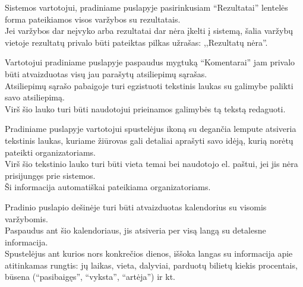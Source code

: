 \documentclass{VUMIFPSkursinis}
\begin{document}
\begin{longtabu}
    {
      Sistemos vartotojui, pradiniame puslapyje pasirinkusiam “Rezultatai” lentelės forma pateikiamos visos varžybos su rezultatais. \\
      Jei varžybos dar neįvyko arba rezultatai dar nėra įkelti į sistemą, šalia varžybų vietoje rezultatų privalo būti pateiktas pilkas užrašas: 
      ,,Rezultatų nėra''. \\
    }
    
    {
      Vartotojui pradiniame puslapyje paspaudus mygtuką “Komentarai” jam privalo būti atvaizduotas visų jau parašytų atsiliepimų sąrašas. \\
      Atsiliepimų sąrašo pabaigoje turi egzistuoti tekstinis laukas su galimybe palikti savo atsiliepimą. \\
      Virš šio lauko turi būti naudotojui prieinamos galimybės tą tekstą redaguoti.
    }
    
    {
      Pradiniame puslapyje vartotojui spustelėjus ikoną su degančia lempute atsiveria tekstinis laukas, kuriame žiūrovas gali detaliai aprašyti savo idėją,
      kurią norėtų pateikti organizatoriams. \\
      Virš šio tekstinio lauko turi būti vieta temai bei naudotojo el. paštui, jei jis nėra prisijungęs prie sistemos. \\
      Ši informacija automatiškai pateikiama organizatoriams.
    }
    
    {
      Pradinio puslapio dešinėje turi būti atvaizduotas kalendorius su visomis varžybomis. \\
      Paspaudus ant šio kalendoriaus, jis atsiveria per visą langą su detalesne informacija. \\
      Spustelėjus ant kurios nors konkrečios dienos, iššoka langas su informacija apie atitinkamas rungtis: 
      jų laikas, vieta, dalyviai, parduotų bilietų kiekis procentais, būsena (“pasibaigęs”, “vyksta”, “artėja”) ir kt.
    }
	\end{longtabu}
\newpage
\end{document}

